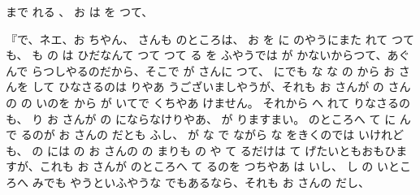 まで
れる
、
お
は
を
つて、

『で、ネエ、お
ちやん、
さんも
のところは、
お
を
に
のやうにまた
れて
つても、
も
の
は
ひだなんて
つて
つて
る
を
ふやうでは
が
かないからつて、あぐんで
らつしやるのだから、そこで
が
さんに
つて、
にでも
な
な
の
から
お
さんを
して
ひなさるのは
りやあ
うございましやうが、それも
お
さんが
の
さんの
の
いのを
から
が
いてで
くちやあ
けません。
それから
へ
れて
りなさるのも、
り
お
さんが
の
にならなけりやあ、
が
りますまい。
のところへ
て
に
んで
るのが
お
さんの
だとも
ふし、
が
な
で
ながら
な
をきくのでは
いけれども、
の
には
の
お
さんの
の
まりも
の
や
て
るだけは
て
げたいともおもひますが、これも
お
さんが
のところへ
て
るのを
つちやあ
は
いし、
し
の
いところへ
みでも
やうといふやうな
でもあるなら、それも
お
さんの
だし、
